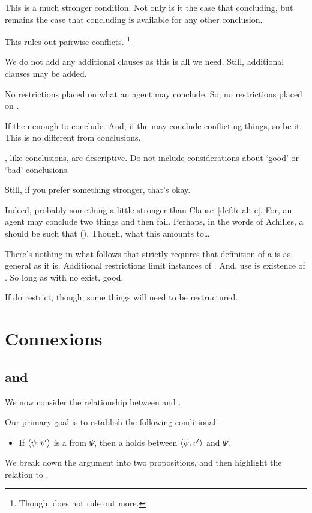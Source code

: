 \begin{note}
  \noindent This is a much stronger condition.
  Not only is it the case that concluding, but remains the case that concluding is available for any other conclusion.

  This rules out pairwise conflicts.%
  \footnote{
    Though, does not rule out more.
  }

  We do not add any additional clauses as this is all we need.
  Still, additional clauses may be added.

  No restrictions placed on what an agent may conclude.
  So, no restrictions placed on .

  If \fc{} then enough to conclude.
  And, if the may conclude conflicting things, so be it.
  This is no different from conclusions.

  , like conclusions, are descriptive.
  Do not include considerations about `good' or `bad' conclusions.
\end{note}

\begin{note}
  Still, if you prefer something stronger, that's okay.

  Indeed, probably something a little stronger than Clause~\autoref{def:fc:alt:c}.
  For, an agent may conclude two things and then fail.
  Perhaps, in the words of Achilles, a \fc{} should be such that  (\cite[280]{Carroll:1895uj}).
  Though, what this amounts to\dots

  There's nothing in what follows that strictly requires that definition of a \fc{} is as general as it is.
  Additional restrictions limit instances of .
  And, use is existence of .
  So long as  with no \wit{} exist, good.

  If do restrict, though, some things will need to be restructured.
\end{note}

\section{Connexions}
\label{sec:connexions}

\subsection{ and \supportII{}}
\label{cha:fc:fc-sII}

\begin{note}
  We now consider the relationship between  and .

  Our primary goal is to establish the following conditional:

  \begin{itemize}
  \item
    If \(\langle \psi, v' \rangle\) is a \fc{} from \(\Psi\), then a \ros{} holds between \(\langle \psi, v' \rangle\) and \(\Psi\).
  \end{itemize}

  \noindent%
  We break down the argument into two propositions, and then highlight the relation to \issueConstraint{}.
\end{note}

